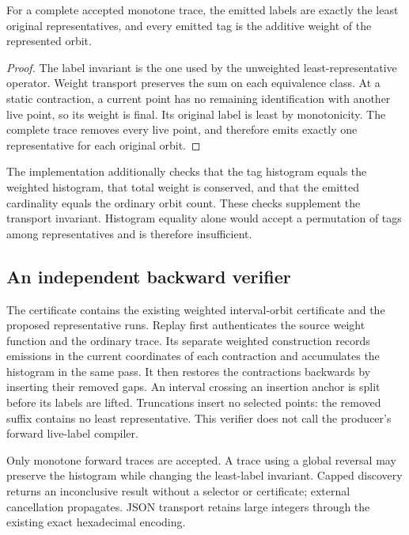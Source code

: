 \begin{proposition}
For a complete accepted monotone trace, the emitted labels are exactly the
least original representatives, and every emitted tag is the additive weight
of the represented orbit.
\end{proposition}
\begin{proof}
The label invariant is the one used by the unweighted least-representative
operator. Weight transport preserves the sum on each equivalence class.
At a static contraction, a current point has no remaining identification with
another live point, so its weight is final. Its original label is least by
monotonicity. The complete trace removes every live point, and therefore
emits exactly one representative for each original orbit.
\end{proof}

The implementation additionally checks that the tag histogram equals the
weighted histogram, that total weight is conserved, and that the emitted
cardinality equals the ordinary orbit count. These checks supplement the
transport invariant. Histogram equality alone would accept a permutation
of tags among representatives and is therefore insufficient.

\subsection{An independent backward verifier}

The certificate contains the existing weighted interval-orbit certificate
and the proposed representative runs. Replay first authenticates the source
weight function and the ordinary trace. Its separate weighted construction records emissions in the current
coordinates of each contraction and accumulates the histogram in the same
pass. It then restores the contractions backwards by inserting their removed
gaps.
An interval crossing an insertion anchor is split before its labels are
lifted. Truncations insert no selected points: the removed suffix contains no
least representative. This verifier does not call the producer's forward
live-label compiler.

Only monotone forward traces are accepted. A trace using a global reversal
may preserve the histogram while changing the least-label invariant. Capped
discovery returns an inconclusive result without a selector or certificate;
external cancellation propagates. JSON transport retains large integers
through the existing exact hexadecimal encoding.

